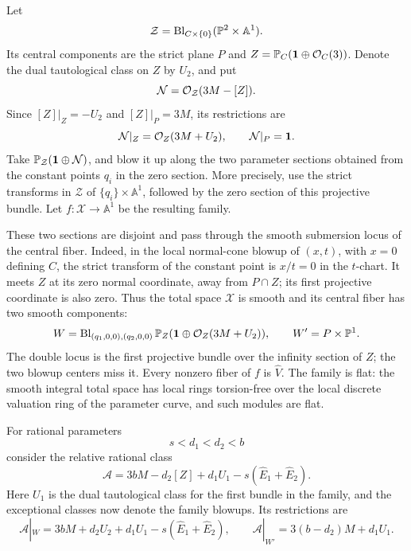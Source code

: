 Let
\[
 \mathcal Z=\operatorname{Bl}_{C\times\{0\}}(\mathbb P^2\times\mathbb A^1).
 \]
Its central components are the strict plane \(P\) and
\(Z=\mathbb P_C(\mathbf1\oplus\mathcal O_C(3))\).  Denote the dual tautological
class on \(Z\) by \(U_2\), and put
\[
 \mathcal N=\mathcal O_{\mathcal Z}(3M-[Z]).
 \]
Since \([Z]|_Z=-U_2\) and \([Z]|_P=3M\), its restrictions are
\begin{equation}\label{six:N-restrictions}
 \mathcal N|_Z=\mathcal O_Z(3M+U_2),\qquad
 \mathcal N|_P=\mathbf1.
\end{equation}
Take \(\mathbb P_{\mathcal Z}(\mathbf1\oplus\mathcal N)\), and blow it
up along the two parameter sections obtained from the constant
points \(q_i\) in the zero section.  More precisely, use the
strict transforms in \(\mathcal Z\) of
\(\{q_i\}\times\mathbb A^1\), followed by the zero section of
this projective bundle.  Let \(f:\mathcal X\to\mathbb A^1\)
be the resulting family.

These two sections are disjoint and pass through the smooth
submersion locus of the central fiber.  Indeed, in the local
normal-cone blowup of \((x,t)\), with \(x=0\) defining \(C\),
the strict transform of the constant point is \(x/t=0\) in
the \(t\)-chart.  It meets \(Z\) at its zero normal coordinate,
away from \(P\cap Z\); its first projective coordinate is also
zero.  Thus the total space \(\mathcal X\) is smooth and its
central fiber has two smooth components:
\[
 W=\operatorname{Bl}_{(q_1,0,0),(q_2,0,0)}
       \mathbb P_Z(\mathbf1\oplus\mathcal O_Z(3M+U_2)),
 \qquad
 W'=P\times\mathbb P^1.
\]
The double locus is the first projective bundle over the infinity
section of \(Z\); the two blowup centers miss it.  Every nonzero
fiber of \(f\) is \(\widehat V\).  The family is flat: the smooth
integral total space has local rings torsion-free over the local
discrete valuation ring of the parameter curve, and such modules
are flat.

For rational parameters
\begin{equation}\label{six:d-parameters}
 s<d_1<d_2<b
\end{equation}
consider the relative rational class
\begin{equation}\label{six:relative-class}
 \mathcal A=3bM-d_2[Z]+d_1U_1
              -s(\widehat E_1+\widehat E_2).
\end{equation}
Here \(U_1\) is the dual tautological class for the first bundle
in the family, and the exceptional classes now denote the
family blowups.  Its restrictions are
\begin{equation}\label{six:component-classes}
 \mathcal A|_W=3bM+d_2U_2+d_1U_1
                      -s(\widehat E_1+\widehat E_2),
 \qquad
 \mathcal A|_{W'}=3(b-d_2)M+d_1U_1.
\end{equation}

